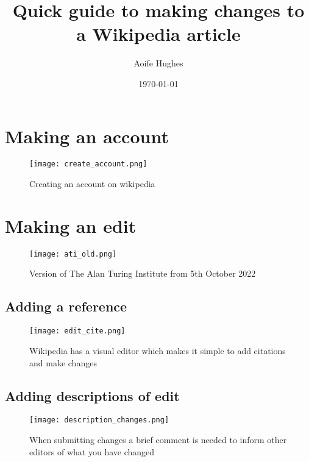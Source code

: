 \documentclass[11pt]{article}
\title{Quick guide to making changes to a Wikipedia article}
\author{ Aoife Hughes }
\date{\today}
\begin{document}
\maketitle	
\pagebreak



\section{Making an account}


\begin{figure}[ht]
     \centering
     \texttt{[image: create\_account.png]}
     \caption[Creating an account on wikipedia]{Creating an account on wikipedia}
     \label{fig:create_account}
\end{figure}


\section{Making an edit}

\begin{figure}[ht]
     \centering
     \texttt{[image: ati\_old.png]}
     \caption[Version of The Alan Turing Institute from 5th October 2022]{Version of The Alan Turing Institute from 5th October 2022}
     \label{fig:ati_old}
\end{figure}

\clearpage

\subsection{Adding a reference}


\begin{figure}[ht]
     \centering
     \texttt{[image: edit\_cite.png]}
     \caption[Wikipedia has a visual editor which makes it simple to add citations and make changes]{Wikipedia has a visual editor which makes it simple to add citations and make changes}
     \label{fig:edit_cite}
\end{figure}


\clearpage
\subsection{Adding descriptions of edit}

\begin{figure}[ht]
     \centering
     \texttt{[image: description\_changes.png]}
     \caption[When submitting changes a brief comment is needed to inform other editors of what you have changed]{When submitting changes a brief comment is needed to inform other editors of what you have changed}
     \label{fig:description_changes}
\end{figure}
\end{document}
